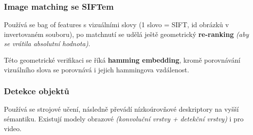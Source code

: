 \subsubsection*{Image matching se SIFTem}

Používá se bag of features s vizuálními slovy (1 slovo = SIFT, id obrázků v invertovaném souboru), po matchnutí se udělá ještě geometrický \textbf{re-ranking} \textit{(aby se vrátila absolutní hodnota)}.

Této geometrické verifikaci se říká \textbf{hamming embedding}, kromě porovnává\-ní vizuálního slova se porovnává i jejich hammingova vzdálenost.

\subsubsection*{Detekce objektů}

Používá se strojové učení, následně převádí nízkoúrovňové deskriptory na vyšší sémantiku. Existují modely obrazové \textit{(konvoluční vrstvy + detekční vrstvy)} i pro video.
